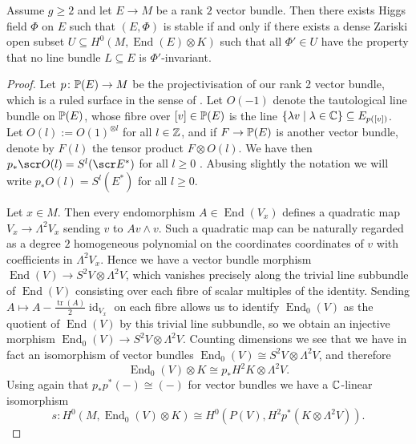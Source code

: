 \documentclass[A4paper, 12pt, british, reqno]{amsart}
\DeclareMathOperator{\End}{End}
\DeclareMathOperator{\id}{id}
\newcommand{\ot}{\otimes}
\newcommand{\dual}{^{*}}
\begin{document}
\begin{prop}
    Assume $g\geqslant 2$ and let $E\to M$ be a rank $2$ vector bundle.
    Then there exists Higgs field $\Phi$ on $E$ such that $(E,\Phi)$ is stable if and only if there exists a dense Zariski open subset $U\subseteq H^{0}(M,\End(E)\ot K)$ such that all $\Phi'\in U$ have the property that no line bundle $L\subseteq E$ is $\Phi'$-invariant.
    \begin{proof}
	Let $p\colon \P(E)\to M$ be the projectivisation of our rank 2 vector bundle, which is a ruled surface in the sense of \cite[\S V.2]{har77}.
	Let $O(-1)$ denote the tautological line bundle on $\P(E)$, whose fibre over $[v]\in \P(E)$ is the line $\{\lambda v \mid \lambda\in \C\}\subseteq E_{p([v])}$.
	Let $O(l):=O(1)^{\ot l}$ for all $l\in \Z$, and if $F\to \P(E)$ is another vector bundle, denote by $F(l)$ the tensor product $F\ot O(l)$.
	We have then $p_{*}\O(l)=S^{l}(\E\dual)$ for all $l\geqslant 0$ \cite[Exercise III.8.4]{har77}.
	Abusing slightly the notation we will write $p_{*}O(l)=S^{l}(E\dual)$ for all $l\geqslant 0$.

	Let $x\in M$.
	Then every endomorphism $A\in \End(V_{x})$ defines a quadratic map $V_{x}\to \Lambda^{2}V_{x}$ sending $v$ to $Av\wedge v$.
	Such a quadratic map can be naturally regarded as a degree $2$ homogeneous polynomial on the coordinates coordinates of $v$ with coefficients in $\Lambda^{2}V_{x}$.
	Hence we have a vector bundle morphism $\End(V)\to S^{2}V\ot \Lambda^{2}V$, which vanishes precisely along the trivial line subbundle of $\End(V)$ consisting over each fibre of scalar multiples of the identity.
	Sending $A\mapsto A-\frac{\operatorname{tr}(A)}{2}\id_{V_{x}}$ on each fibre allows us to identify $\End_{0}(V)$ as the quotient of $\End(V)$ by this trivial line subbundle, so we obtain an injective morphism $\End_{0}(V)\to S^{2}V\ot \Lambda^{2}V$.
	Counting dimensions we see that we have in fact an isomorphism of vector bundles $\End_{0}(V)\cong S^{2}V\ot \Lambda^{2}V$, and therefore
	\[ \End_{0}(V)\ot K\cong p_{*}H^{2}K\ot \Lambda^{2}V. \]
	Using again that $p_{*}p^{*}(-)\cong (-)$ for vector bundles we have a $\C$-linear isomorphism
	\[ s\colon H^{0}(M,\End_{0}(V)\ot K)\cong H^{0}(P(V),H^{2}p^{*}(K\ot \Lambda^{2}V)). \]


\end{proof}
\end{prop}
\end{document}
